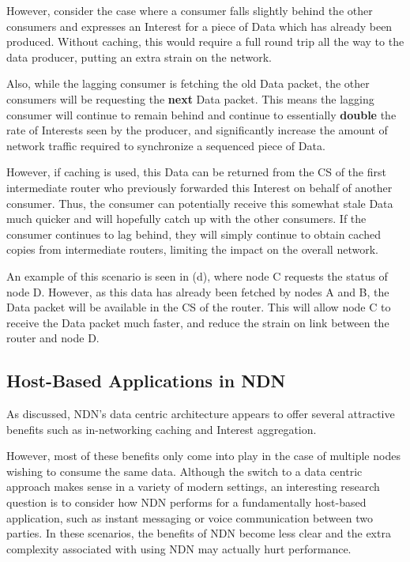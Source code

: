 However, consider the case where a consumer falls slightly behind the other consumers and expresses an Interest for a piece of Data which has already been produced. Without caching, this would require a full round trip all the way to the data producer, putting an extra strain on the network. 

Also, while the lagging consumer is fetching the old Data packet, the other consumers will be requesting the \textbf{next} Data packet. This means the lagging consumer will continue to remain behind and continue to essentially \textbf{double} the rate of Interests seen by the producer, and significantly increase the amount of network traffic required to synchronize a sequenced piece of Data.  

However, if caching is used, this Data can be returned from the CS of the first intermediate router who previously forwarded this Interest on behalf of another consumer. Thus, the consumer can potentially receive this somewhat stale Data much quicker and will hopefully catch up with the other consumers. If the consumer continues to lag behind, they will simply continue to obtain cached copies from intermediate routers, limiting the impact on the overall network.

An example of this scenario is seen in  (d), where node C requests the status of node D. However, as this data has already been fetched by nodes A and B, the Data packet will be available in the CS of the router. This will allow node C to receive the Data packet much faster, and reduce the strain on link between the router and node D.






\subsection{Host-Based Applications in NDN}\label{sec:ndn-host-based}
As discussed, NDN's data centric architecture appears to offer several attractive benefits such as in-networking caching and Interest aggregation. 

However, most of these benefits only come into play in the case of multiple nodes wishing to consume the same data. Although the switch to a data centric approach makes sense in a variety of modern settings, an interesting research question is to consider how NDN performs for a fundamentally host-based application, such as instant messaging or voice communication between two parties. In these scenarios, the benefits of NDN become less clear and the extra complexity associated with using NDN may actually hurt performance.

